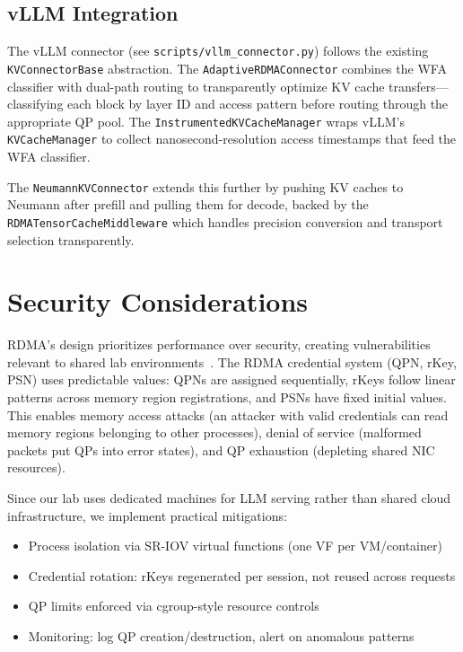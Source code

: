 \documentclass[11pt,letterpaper]{article}
\theoremstyle{definition}
\begin{document}
\subsection{vLLM Integration}

The vLLM connector (see \texttt{scripts/vllm\_connector.py}) follows the existing \texttt{KVConnectorBase} abstraction. The \texttt{AdaptiveRDMAConnector} combines the WFA classifier with dual-path routing to transparently optimize KV cache transfers---classifying each block by layer ID and access pattern before routing through the appropriate QP pool. The \texttt{InstrumentedKVCacheManager} wraps vLLM's \texttt{KVCacheManager} to collect nanosecond-resolution access timestamps that feed the WFA classifier.

The \texttt{NeumannKVConnector} extends this further by pushing KV caches to Neumann after prefill and pulling them for decode, backed by the \texttt{RDMATensorCacheMiddleware} which handles precision conversion and transport selection transparently.

\section{Security Considerations}
\label{sec:security}

RDMA's design prioritizes performance over security, creating vulnerabilities relevant to shared lab environments~\cite{bedrock2022, redmark2021}. The RDMA credential system (QPN, rKey, PSN) uses predictable values: QPNs are assigned sequentially, rKeys follow linear patterns across memory region registrations, and PSNs have fixed initial values. This enables memory access attacks (an attacker with valid credentials can read memory regions belonging to other processes), denial of service (malformed packets put QPs into error states), and QP exhaustion (depleting shared NIC resources).

Since our lab uses dedicated machines for LLM serving rather than shared cloud infrastructure, we implement practical mitigations:
\begin{itemize}[nosep]
    \item Process isolation via SR-IOV virtual functions (one VF per VM/container)
    \item Credential rotation: rKeys regenerated per session, not reused across requests
    \item QP limits enforced via cgroup-style resource controls
    \item Monitoring: log QP creation/destruction, alert on anomalous patterns
\end{itemize}
\end{document}
